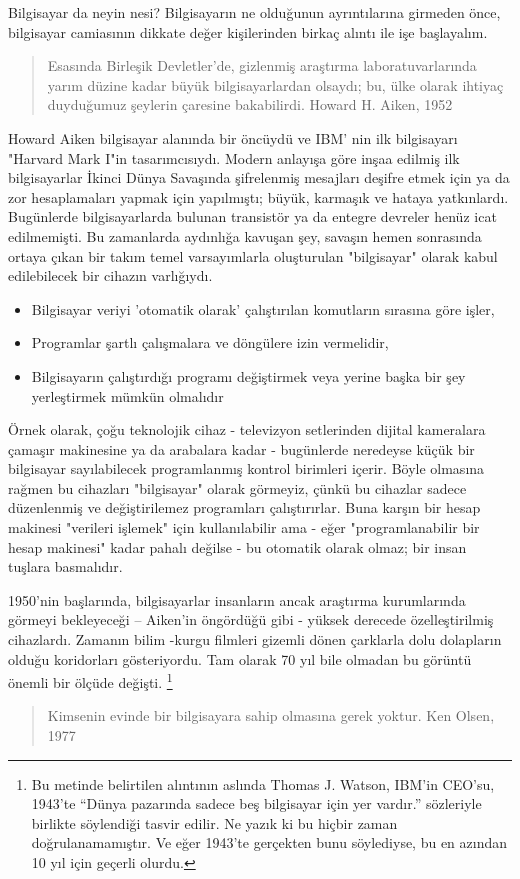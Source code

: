 \begin{section}{Bilgisayar da neyin nesi?}
Bilgisayarın ne olduğunun ayrıntılarına girmeden önce, bilgisayar camiasının dikkate değer kişilerinden birkaç alıntı ile işe başlayalım.
\begin{quote}{Esasında Birleşik Devletler'de, gizlenmiş araştırma laboratuvarlarında yarım düzine kadar büyük bilgisayarlardan olsaydı; bu, ülke olarak ihtiyaç duyduğumuz şeylerin çaresine bakabilirdi. Howard H. Aiken, 1952}
\end{quote}
Howard Aiken bilgisayar alanında bir öncüydü ve IBM' nin ilk bilgisayarı "Harvard Mark I"in tasarımcısıydı. Modern anlayışa göre inşaa edilmiş ilk bilgisayarlar İkinci Dünya Savaşında şifrelenmiş mesajları deşifre etmek için ya da zor hesaplamaları yapmak için yapılmıştı; büyük, karmaşık ve hataya yatkınlardı. Bugünlerde bilgisayarlarda bulunan transistör ya da entegre devreler henüz icat edilmemişti. Bu zamanlarda aydınlığa kavuşan şey, savaşın hemen sonrasında ortaya çıkan bir takım temel varsayımlarla oluşturulan "bilgisayar" olarak kabul edilebilecek bir cihazın varlığıydı.
\begin{itemize}
 \item Bilgisayar veriyi 'otomatik olarak' çalıştırılan komutların sırasına göre işler,
 \item Programlar şartlı çalışmalara ve döngülere izin vermelidir,
 \item Bilgisayarın çalıştırdığı programı değiştirmek veya yerine başka bir şey yerleştirmek mümkün olmalıdır
 \end{itemize}

Örnek olarak, çoğu teknolojik cihaz - televizyon setlerinden dijital kameralara çamaşır makinesine ya da arabalara kadar - bugünlerde neredeyse küçük bir bilgisayar sayılabilecek programlanmış kontrol birimleri içerir. Böyle olmasına rağmen bu cihazları "bilgisayar" olarak görmeyiz, çünkü bu cihazlar sadece düzenlenmiş ve değiştirilemez programları çalıştırırlar.  Buna karşın bir hesap makinesi "verileri işlemek" için kullanılabilir ama - eğer "programlanabilir bir hesap makinesi" kadar pahalı değilse - bu otomatik olarak olmaz; bir insan tuşlara basmalıdır.

1950'nin başlarında, bilgisayarlar insanların ancak araştırma kurumlarında görmeyi bekleyeceği – Aiken'in öngördüğü gibi - yüksek derecede özelleştirilmiş cihazlardı. Zamanın bilim -kurgu filmleri gizemli dönen çarklarla dolu dolapların olduğu koridorları gösteriyordu. Tam olarak 70 yıl bile olmadan bu görüntü önemli bir ölçüde değişti. 
\footnote{Bu metinde belirtilen alıntının aslında Thomas J. Watson, IBM'in CEO'su, 1943'te “Dünya pazarında sadece beş bilgisayar için yer vardır.” sözleriyle birlikte söylendiği tasvir edilir. Ne yazık ki bu hiçbir zaman doğrulanamamıştır. Ve eğer 1943'te gerçekten bunu söylediyse, bu en azından 10 yıl için geçerli olurdu.}
\begin{quote}
{Kimsenin evinde bir bilgisayara sahip olmasına gerek yoktur. Ken Olsen, 1977}
\end{quote}


\end{section}

